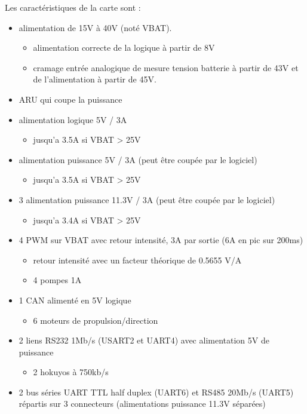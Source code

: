 Les caractéristiques de la carte sont :
\begin{itemize}
	\item alimentation de 15V à 40V (noté VBAT).
		\begin{itemize}
			\item alimentation correcte de la logique à partir de 8V
			\item cramage entrée analogique de mesure tension batterie à partir de 43V et de l'alimentation à partir de 45V.
		\end{itemize}
	\item ARU qui coupe la puissance
	\item alimentation logique 5V / 3A
		\begin{itemize}
			\item jusqu'a 3.5A si VBAT > 25V
		\end{itemize}
	\item alimentation puissance 5V / 3A (peut être coupée par le logiciel)
		\begin{itemize}
			\item jusqu'a 3.5A si VBAT > 25V
		\end{itemize}
	\item 3 alimentation puissance 11.3V / 3A (peut être coupée par le logiciel)
		\begin{itemize}
			\item jusqu'a 3.4A si VBAT > 25V
		\end{itemize}
	\item 4 PWM sur VBAT avec retour intensité, 3A par sortie (6A en pic sur 200ms)
		\begin{itemize}
			\item retour intensité avec un facteur théorique de 0.5655 V/A
			\item 4 pompes 1A
		\end{itemize}
	\item 1 CAN alimenté en 5V logique
		\begin{itemize}
			\item 6 moteurs de propulsion/direction
		\end{itemize}
	\item 2 liens RS232 1Mb/s (USART2 et UART4) avec alimentation 5V de puissance
		\begin{itemize}
			\item 2 hokuyos à 750kb/s
		\end{itemize}
	\item 2 bus séries UART TTL half duplex (UART6) et RS485 20Mb/s (UART5) répartis sur 3 connecteurs (alimentations puissance 11.3V séparées)

\end{itemize}
